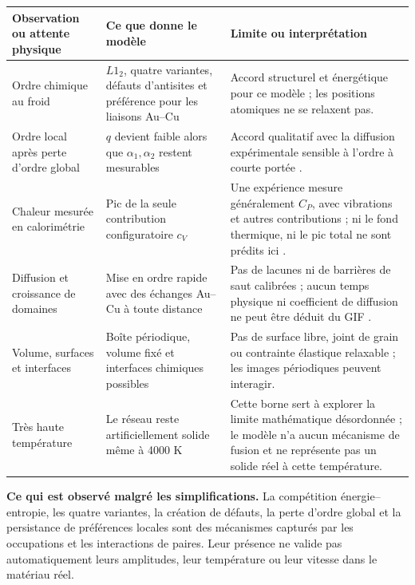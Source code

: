 \documentclass[10pt,a4paper]{article}
\begin{document}
\begin{center}\small
\begin{tabular}{>{\raggedright\arraybackslash}p{.22\linewidth}>{\raggedright\arraybackslash}p{.34\linewidth}>{\raggedright\arraybackslash}p{.33\linewidth}}
\toprule
Observation ou attente physique & Ce que donne le modèle & Limite ou interprétation\\\midrule
Ordre chimique au froid & $L1_2$, quatre variantes, défauts d'antisites et
préférence pour les liaisons Au--Cu & Accord structurel et énergétique
pour ce modèle ; les positions atomiques ne se relaxent pas.\\
Ordre local après perte d'ordre global & $q$ devient faible alors que
$\alpha_1,\alpha_2$ restent mesurables & Accord qualitatif avec la diffusion
expérimentale sensible à l'ordre à courte portée \cite{owen}.\\
Chaleur mesurée en calorimétrie & Pic de la seule contribution
configuratoire $c_V$ & Une expérience mesure généralement $C_P$, avec
vibrations et autres contributions ; ni le fond thermique, ni le pic
total ne sont prédits ici \cite{benisek}.\\
Diffusion et croissance de domaines & Mise en ordre rapide avec des
échanges Au--Cu à toute distance & Pas de lacunes ni de barrières de saut
calibrées ; aucun temps physique ni coefficient de diffusion ne peut
être déduit du GIF \cite{kessler}.\\
Volume, surfaces et interfaces & Boîte périodique, volume fixé et interfaces
chimiques possibles & Pas de surface libre, joint de grain ou contrainte
élastique relaxable ; les images périodiques peuvent interagir.\\
Très haute température & Le réseau reste artificiellement solide même
à 4000 K & Cette borne sert à explorer la limite mathématique désordonnée ;
le modèle n'a aucun mécanisme de fusion et ne représente pas un solide réel à cette température.\\
\bottomrule
\end{tabular}\end{center}

\textbf{Ce qui est observé malgré les simplifications.} La compétition
énergie--entropie, les quatre variantes, la création de défauts, la perte
d'ordre global et la persistance de préférences locales sont des mécanismes
capturés par les occupations et les interactions de paires. Leur présence
ne valide pas automatiquement leurs amplitudes, leur température ou
leur vitesse dans le matériau réel.
\end{document}
